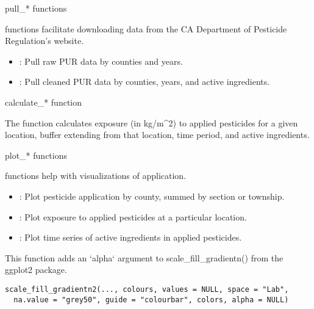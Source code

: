 \documentclass[a4paper]{book}
\begin{document}
%
\begin{Section}{pull\_* functions}

 functions facilitate downloading data from the CA Department
of Pesticide Regulation's website.
\begin{itemize}

\item {}: Pull raw PUR data by counties and years.
\item {}: Pull cleaned PUR data by counties, years, and
active ingredients.

\end{itemize}

\end{Section}
%
\begin{Section}{calculate\_* function}

The  function calculates exposure (in kg/m\textasciicircum{}2) to
applied pesticides for a given location, buffer extending from that location,
time period, and active ingredients.
\end{Section}
%
\begin{Section}{plot\_* functions}

 functions help with visualizations of application.
\begin{itemize}

\item {}: Plot pesticide application by county,
summed by section or township.
\item {}: Plot exposure to applied pesticides at a
particular location.
\item {}: Plot time series of active
ingredients in applied pesticides.

\end{itemize}

\end{Section}
%
\begin{Description}\relax
This function adds an `alpha` argument to scale\_fill\_gradientn() from the
ggplot2 package.
\end{Description}
%
\begin{Usage}
\begin{verbatim}
scale_fill_gradientn2(..., colours, values = NULL, space = "Lab",
  na.value = "grey50", guide = "colourbar", colors, alpha = NULL)
\end{verbatim}
\end{Usage}
\end{document}
